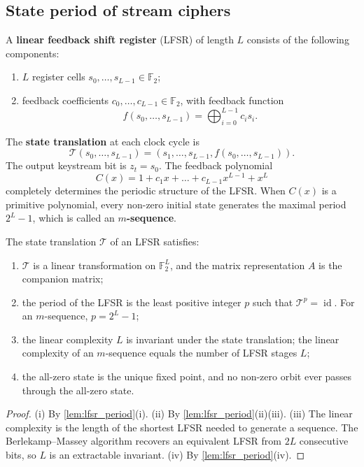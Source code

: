 \subsection{State period of stream ciphers}

\begin{definition}\label{def:lfsr}
A \textbf{linear feedback shift register} (LFSR) of length \(L\) consists of the following components:
\begin{enumerate}[label=(\roman*)]
    \item \(L\) register cells \(s_0,\dots,s_{L-1}\in\mathbb F_2\);
    \item feedback coefficients \(c_0,\dots,c_{L-1}\in\mathbb F_2\), with feedback function
    \[
    f(s_0,\dots,s_{L-1})=\bigoplus_{i=0}^{L-1}c_i s_i.
    \]
\end{enumerate}
The \textbf{state translation} at each clock cycle is
\[
\mathcal T(s_0,\dots,s_{L-1})=(s_1,\dots,s_{L-1},f(s_0,\dots,s_{L-1})).
\]
The output keystream bit is \(z_t=s_0\). The feedback polynomial
\[
C(x)=1+c_1x+\dots+c_{L-1}x^{L-1}+x^L
\]
completely determines the periodic structure of the LFSR. When \(C(x)\) is a primitive polynomial, every non-zero initial state generates the maximal period \(2^L-1\), which is called an \textbf{\(m\)-sequence}.
\end{definition}

\begin{proposition}\label{prop:lfsr_algebraic_properties}
The state translation \(\mathcal T\) of an LFSR satisfies:
\begin{enumerate}[label=(\roman*)]
    \item \(\mathcal T\) is a linear transformation on \(\mathbb F_2^L\), and the matrix representation \(A\) is the companion matrix;
    \item the period of the LFSR is the least positive integer \(p\) such that \(\mathcal T^p=\operatorname{id}\). For an \(m\)-sequence, \(p=2^L-1\);
    \item the linear complexity \(L\) is invariant under the state translation; the linear complexity of an \(m\)-sequence equals the number of LFSR stages \(L\);
    \item the all-zero state is the unique fixed point, and no non-zero orbit ever passes through the all-zero state.
\end{enumerate}
\end{proposition}

\begin{proof}
(i) By \cref{lem:lfsr_period}(i).
(ii) By \cref{lem:lfsr_period}(ii)(iii).
(iii) The linear complexity is the length of the shortest LFSR needed to generate a sequence. The Berlekamp--Massey algorithm recovers an equivalent LFSR from \(2L\) consecutive bits, so \(L\) is an extractable invariant.
(iv) By \cref{lem:lfsr_period}(iv).
\end{proof}

